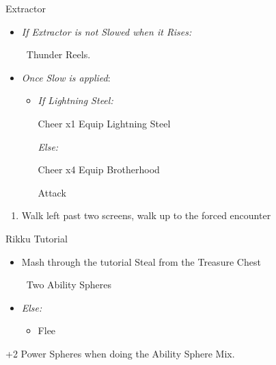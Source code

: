\begin{battle}[4000]{Extractor}
    \begin{itemize}
        \tidusf Haste self
        \wakkaf If anyone is below 216 HP Hi-Potion them, otherwise Attack
        \tidusf Attack Extractor until you apply Slow (turn order will show \wakka\ 2 turns, \tidus\ 3 turns per \enemy\ turn)
        \item \textit{If Extractor is not Slowed when it Rises:}
        \begin{itemize}
            \wakkaf \od\ Thunder Reels.
        \end{itemize}
        \item \textit{Once Slow is applied}:
        \begin{itemize}
            \tidusf Haste Wakka
            \item \textit{If Lightning Steel:}
            \begin{itemize}
                \tidusf Cheer x1
                \tidusf Equip Lightning Steel
            \end{itemize}
            \textit{Else:}
            \begin{itemize}
                \tidusf Cheer x4
                \tidusf Equip Brotherhood
            \end{itemize}
            \tidusf Attack
        \end{itemize}
    \end{itemize}
\end{battle}
\begin{enumerate}[resume]
    \item Walk left past two screens, walk up to the forced encounter
\end{enumerate}
\begin{battle}{Rikku Tutorial}
    \begin{itemize}
        \item Mash through the tutorial
        \rikkuf Steal from the Treasure Chest
        \begin{itemize}
            \rikkuf \od\ Two Ability Spheres
        \end{itemize}
        \item \textit{Else:}
        \begin{itemize}
            \rikkuf \od\ Two Potions or Hi-Potions
            \rikkuf Defend
            \item Flee
        \end{itemize}
    \end{itemize}
    +2 Power Spheres when doing the Ability Sphere Mix.
\end{battle}
